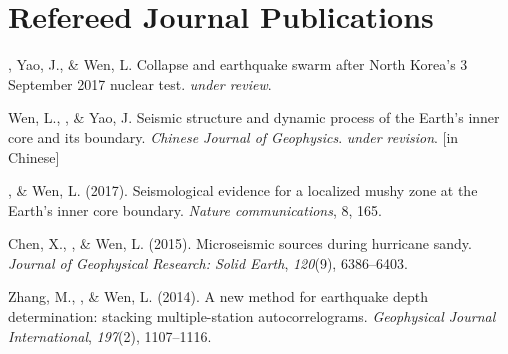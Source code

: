 \section*{Refereed Journal Publications}
\begin{etaremune}
\item
    \Tian, Yao, J., \& Wen, L.
    Collapse and earthquake swarm after North Korea's 3 September 2017 nuclear test.
    \textit{under review}.
\item
    Wen, L., \Tian, \& Yao, J.
    Seismic structure and dynamic process of the Earth's inner core and its boundary.
    \textit{Chinese Journal of Geophysics}.
    \textit{under revision}. [in Chinese]
\item
    \Tian, \& Wen, L. (2017).
    Seismological evidence for a localized mushy zone at the Earth's inner core boundary.
    \textit{Nature communications}, 8, 165.
\item
    Chen, X., \Tian, \& Wen, L. (2015).
    Microseismic sources during hurricane sandy.
    \textit{Journal of Geophysical Research: Solid Earth}, \textit{120}(9), 6386--6403.
\item Zhang, M., \Tian, \& Wen, L. (2014).
    A new method for earthquake depth determination: stacking multiple-station autocorrelograms.
    \textit{Geophysical Journal International}, \textit{197}(2), 1107--1116.\\
\end{etaremune}
